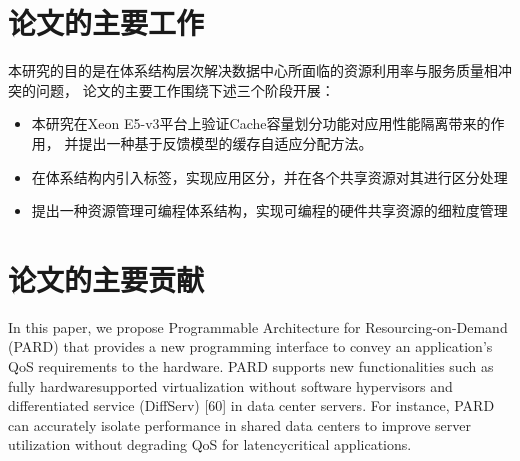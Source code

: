 

\section{论文的主要工作}




本研究的目的是在体系结构层次解决数据中心所面临的资源利用率与服务质量相冲突的问题，
论文的主要工作围绕下述三个阶段开展：

\begin{itemize}
 \item 本研究在Xeon E5-v3平台上验证Cache容量划分功能对应用性能隔离带来的作用，
       并提出一种基于反馈模型的缓存自适应分配方法。
 \item 在体系结构内引入标签，实现应用区分，并在各个共享资源对其进行区分处理
 \item 提出一种资源管理可编程体系结构，实现可编程的硬件共享资源的细粒度管理
\end{itemize}


\section{论文的主要贡献}
In this paper, we propose Programmable Architecture for
Resourcing-on-Demand (PARD) that provides a new programming
interface to convey an application’s QoS requirements to the hardware.
PARD supports new functionalities such as fully hardwaresupported
virtualization without software hypervisors and differentiated
service (DiffServ) [60] in data center servers. For instance,
PARD can accurately isolate performance in shared data centers
to improve server utilization without degrading QoS for latencycritical
applications.



